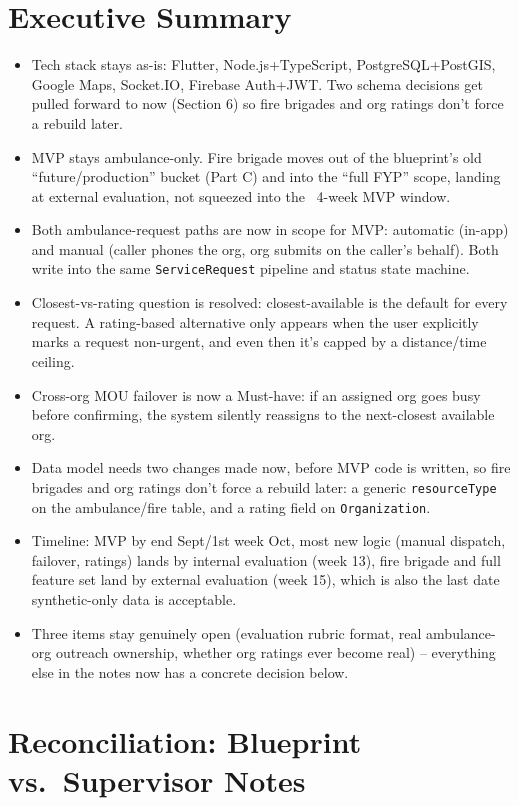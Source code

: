 \documentclass[11pt,a4paper]{article}
\begin{document}
\section*{Executive Summary}

\begin{itemize}
  \item Tech stack stays as-is: Flutter, Node.js+TypeScript, PostgreSQL+PostGIS, Google Maps, Socket.IO, Firebase Auth+JWT. Two schema decisions get pulled forward to now (Section 6) so fire brigades and org ratings don't force a rebuild later.
  \item MVP stays ambulance-only. Fire brigade moves out of the blueprint's old ``future/production'' bucket (Part C) and into the ``full FYP'' scope, landing at external evaluation, not squeezed into the ~4-week MVP window.
  \item Both ambulance-request paths are now in scope for MVP: automatic (in-app) and manual (caller phones the org, org submits on the caller's behalf). Both write into the same \texttt{ServiceRequest} pipeline and status state machine.
  \item Closest-vs-rating question is resolved: closest-available is the default for every request. A rating-based alternative only appears when the user explicitly marks a request non-urgent, and even then it's capped by a distance/time ceiling.
  \item Cross-org MOU failover is now a Must-have: if an assigned org goes busy before confirming, the system silently reassigns to the next-closest available org.
  \item Data model needs two changes made now, before MVP code is written, so fire brigades and org ratings don't force a rebuild later: a generic \texttt{resourceType} on the ambulance/fire table, and a rating field on \texttt{Organization}.
  \item Timeline: MVP by end Sept/1st week Oct, most new logic (manual dispatch, failover, ratings) lands by internal evaluation (week 13), fire brigade and full feature set land by external evaluation (week 15), which is also the last date synthetic-only data is acceptable.
  \item Three items stay genuinely open (evaluation rubric format, real ambulance-org outreach ownership, whether org ratings ever become real) -- everything else in the notes now has a concrete decision below.
\end{itemize}

\section*{Reconciliation: Blueprint vs.\ Supervisor Notes}
\end{document}
